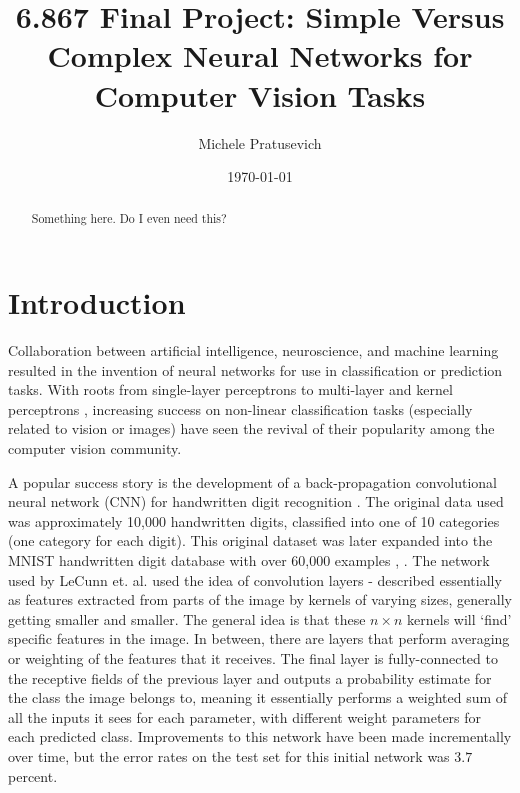 \documentclass[10pt]{article}
\begin{document}
\title{6.867 Final Project: Simple Versus Complex Neural Networks for Computer Vision Tasks}
\author{Michele Pratusevich}
\date{\today}
\maketitle

\begin{abstract}
Something here. Do I even need this?
\end{abstract}

\section{Introduction}

Collaboration between artificial intelligence, neuroscience, and machine learning resulted in the invention of neural networks for use in classification or prediction tasks. With roots from single-layer perceptrons \cite{rosenblatt_perceptron:_1958} to multi-layer and kernel perceptrons \cite{aizerman_theoretical_1964}, increasing success on non-linear classification tasks (especially related to vision or images) have seen the revival of their popularity among the computer vision community. 

A popular success story is the development of a back-propagation convolutional neural network (CNN) for handwritten digit recognition \cite{lecun_handwritten_1990}. The original data used was approximately 10,000 handwritten digits, classified into one of 10 categories (one category for each digit). This original dataset was later expanded into the MNIST handwritten digit database with over 60,000 examples \cite{lecun_gradient-based_1998}, \cite{li_deng_mnist_2012}. The network used by LeCunn et. al. used the idea of convolution layers - described essentially as features extracted from parts of the image by kernels of varying sizes, generally getting smaller and smaller. The general idea is that these $n \times n$ kernels will `find' specific features in the image. In between, there are layers that perform averaging or weighting of the features that it receives. The final layer is fully-connected to the receptive fields of the previous layer and outputs a probability estimate for the class the image belongs to, meaning it essentially performs a weighted sum of all the inputs it sees for each parameter, with different weight parameters for each predicted class. Improvements to this network have been made incrementally over time, but the error rates on the test set for this initial network was $3.7$ percent. 
\end{document}
